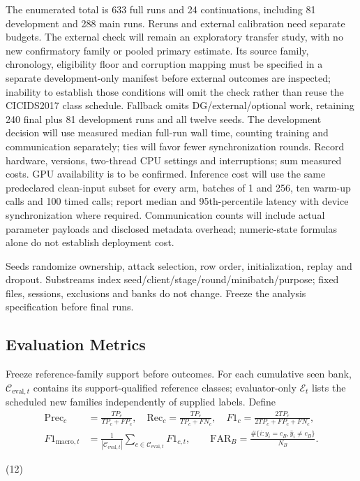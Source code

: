\documentclass[10pt,a4paper]{article}
\begin{document}
The enumerated total is 633 full runs and 24 continuations, including 81 development and 288 main runs. Reruns and external calibration need separate budgets. The external check will remain an exploratory transfer study, with no new confirmatory family or pooled primary estimate. Its source family, chronology, eligibility floor and corruption mapping must be specified in a separate development-only manifest before external outcomes are inspected; inability to establish those conditions will omit the check rather than reuse the CICIDS2017 class schedule. Fallback omits DG/external/optional work, retaining 240 final plus 81 development runs and all twelve seeds. The development decision will use measured median full-run wall time, counting training and communication separately; ties will favor fewer synchronization rounds. Record hardware, versions, two-thread CPU settings and interruptions; sum measured costs. GPU availability is to be confirmed. Inference cost will use the same predeclared clean-input subset for every arm, batches of 1 and 256, ten warm-up calls and 100 timed calls; report median and 95th-percentile latency with device synchronization where required. Communication counts will include actual parameter payloads and disclosed metadata overhead; numeric-state formulas alone do not establish deployment cost.


Seeds randomize ownership, attack selection, row order, initialization, replay and dropout. Substreams index seed/client/stage/round/minibatch/purpose; fixed files, sessions, exclusions and banks do not change. Freeze the analysis specification before final runs.

\subsection{Evaluation Metrics}
Freeze reference-family support before outcomes. For each cumulative seen bank, $\mathcal C_{{\mathrm{eval}},t}$ contains its support-qualified reference classes; evaluator-only $\mathcal E_t$ lists the scheduled new families independently of supplied labels. Define
\begin{equation}
\begin{aligned}
\mathrm{Prec}_c&=\frac{TP_c}{TP_c+FP_c},\quad\mathrm{Rec}_c=\frac{TP_c}{TP_c+FN_c},\quad
F1_c=\frac{2TP_c}{2TP_c+FP_c+FN_c},\\
F1_{{\mathrm{macro}},t}&=\frac1{|\mathcal C_{{\mathrm{eval}},t}|}\sum_{c\in\mathcal C_{{\mathrm{eval}},t}}F1_{c,t},\qquad
\mathrm{FAR}_B=\frac{\#\{i:y_i=c_B,\widehat y_i\ne c_B\}}{N_B}.
\end{aligned}

\end{equation}
\par\hfill(12)\par
\end{document}
